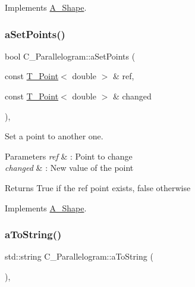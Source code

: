 Implements \hyperlink{classA__Shape_a25b4e0c34cdb46da5382fe9c7467efaf}{A\+\_\+\+Shape}.

\mbox{\label{classC__Parallelogram_adfe1c40f2d33955617e3a535c548dfa0}} 
\subsubsection{\texorpdfstring{a\+Set\+Points()}{aSetPoints()}}
{\footnotesize\ttfamily bool C\+\_\+\+Parallelogram\+::a\+Set\+Points (\begin{DoxyParamCaption}\item[{const \hyperlink{classT__Point}{T\+\_\+\+Point}$<$ double $>$ \&}]{ref,  }\item[{const \hyperlink{classT__Point}{T\+\_\+\+Point}$<$ double $>$ \&}]{changed }\end{DoxyParamCaption})\hspace{0.3cm}{\ttfamily [override]}, {\ttfamily [virtual]}}



Set a point to another one. 


\begin{DoxyParams}{Parameters}
{\em ref} & \+: Point to change \\
\hline
{\em changed} & \+: New value of the point \\
\hline
\end{DoxyParams}
\begin{DoxyReturn}{Returns}
True if the ref point exists, false otherwise 
\end{DoxyReturn}


Implements \hyperlink{classA__Shape_a6996f454b337f8425ad13cba3f7a7c35}{A\+\_\+\+Shape}.

\mbox{\label{classC__Parallelogram_add67ef2aba5e14c27e30a958e4843223}} 
\subsubsection{\texorpdfstring{a\+To\+String()}{aToString()}}
{\footnotesize\ttfamily std\+::string C\+\_\+\+Parallelogram\+::a\+To\+String (\begin{DoxyParamCaption}{ }\end{DoxyParamCaption})\hspace{0.3cm}{\ttfamily [override]}, {\ttfamily [virtual]}}



